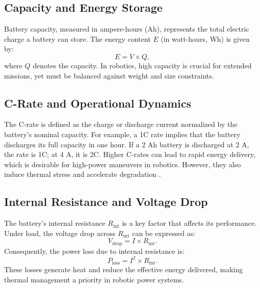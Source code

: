 \subsection{Capacity and Energy Storage}
Battery capacity, measured in ampere-hours (Ah), represents the total electric charge a battery can store. The energy content \(E\) (in watt-hours, Wh) is given by:
\begin{equation}
E = V \times Q,
\end{equation}
where \(Q\) denotes the capacity. In robotics, high capacity is crucial for extended missions, yet must be balanced against weight and size constraints.

\subsection{C-Rate and Operational Dynamics}
The C-rate is defined as the charge or discharge current normalized by the battery's nominal capacity. For example, a 1C rate implies that the battery discharges its full capacity in one hour. If a 2 Ah battery is discharged at 2 A, the rate is 1C; at 4 A, it is 2C. Higher C-rates can lead to rapid energy delivery, which is desirable for high-power maneuvers in robotics. However, they also induce thermal stress and accelerate degradation \cite{Rahman2024}.

\subsection{Internal Resistance and Voltage Drop}
The battery’s internal resistance \(R_{\text{int}}\) is a key factor that affects its performance. Under load, the voltage drop across \(R_{\text{int}}\) can be expressed as:
\begin{equation}
V_{\text{drop}} = I \times R_{\text{int}}.
\end{equation}
Consequently, the power loss due to internal resistance is:
\begin{equation}
P_{\text{loss}} = I^2 \times R_{\text{int}}.
\end{equation}
These losses generate heat and reduce the effective energy delivered, making thermal management a priority in robotic power systems.

